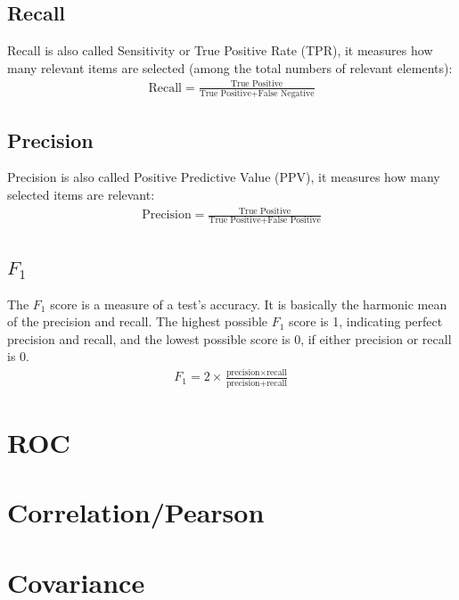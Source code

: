 	
	
\subsection{Recall}

Recall is also called Sensitivity or True Positive Rate (TPR), it measures how many relevant items are selected (among the total numbers of relevant elements):
\begin{eqnarray}
\text{Recall} = \frac{\text{True Positive}}{\text{True Positive}+\text{False Negative}}
\label{recall}
\end{eqnarray} 

\subsection{Precision}

Precision is also called Positive Predictive Value (PPV), it measures how many selected items are relevant:
\begin{eqnarray}
\text{Precision} = \frac{\text{True Positive}}{\text{True Positive}+\text{False Positive}}
\label{precision}
\end{eqnarray} 

\subsection{$F_1$}

The $F_1$ score is a measure of a test's accuracy. It is basically the harmonic mean of the precision and recall. The highest possible $F_1$ score is 1, indicating perfect precision and recall, and the lowest possible score is 0, if either precision or recall is 0.
\begin{eqnarray}
F_1 = 2 \times \frac{\text{precision}\times\text{recall}}{\text{precision} + \text{recall}}
\label{f1}
\end{eqnarray} 

\section{ROC}



\section{Correlation/Pearson}

\section{Covariance}

